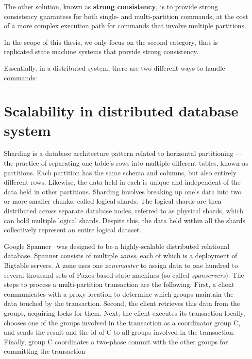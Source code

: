 The other solution, known as \textbf{strong consistency}, is to
provide strong consistency guarantees for both single- and multi-partition
commands, at the cost of a more complex execution path for commands that involve
multiple partitions.


In the scope of this thesis, we only focus on the second
category, that is replicated state machine systems that provide strong
consistency.

Essentially, in a distributed system, there are two different ways to handle commands:


\section{Scalability in distributed database system}

Sharding is a database architecture pattern related to horizontal partitioning —
the practice of separating one table’s rows into multiple different tables,
known as partitions. Each partition has the same schema and columns, but also
entirely different rows. Likewise, the data held in each is unique and
independent of the data held in other partitions. Sharding involves breaking up
one’s data into two or more smaller chunks, called logical shards. The logical
shards are then distributed across separate database nodes, referred to as
physical shards, which can hold multiple logical shards. Despite this, the data
held within all the shards collectively represent an entire logical dataset.

Google Spanner~\cite{corbett2013spanner} was designed to be a highly-scalable
distributed relational database. Spanner consists of multiple \emph{zones}, each
of which is a deployment of Bigtable servers. A zone uses one \emph{zonemaster}
to assign data to one hundred to several thousand sets of Paxos-based state
machines (so called \emph{spanservers}).
The steps to process a multi-partition transaction are the following. First, a
client communicates with a proxy location to determine which groups maintain the
data touched by the transaction. Second, the client retrieves this data from the
groups, acquiring locks for them. Next, the client executes its transaction
locally, chooses one of the groups involved in the transaction as a coordinator
group C, and sends the result and the id of C to all groups involved in the
transaction. Finally, group C coordinates a two-phase commit with the other
groups for committing the transaction


